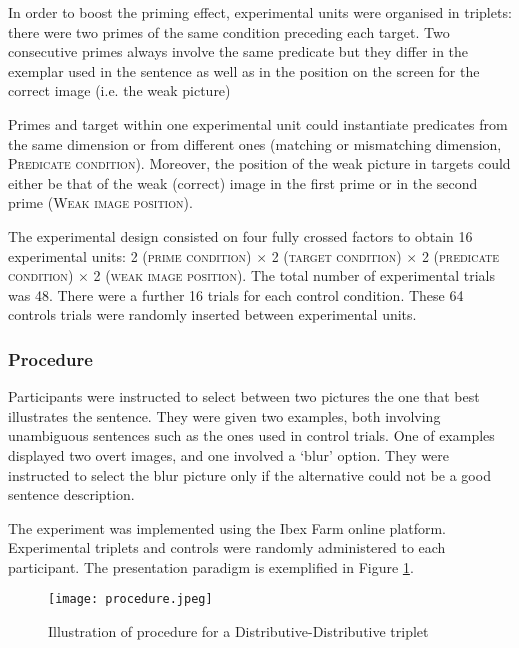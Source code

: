 \documentclass[a4paper, 11pt]{article}
\begin{document}
In order to boost the priming effect, experimental units were organised in triplets: there were two primes of the same condition preceding each target. Two consecutive primes always involve the same predicate but they differ in the exemplar used in the sentence as well as in the position on the screen for the correct image (i.e. the weak picture)

Primes and target within one experimental unit could instantiate predicates from the same dimension or from different ones (matching or mismatching dimension, \textsc{Predicate condition}). Moreover, the position of the weak picture in targets could either be that of the weak (correct) image in the first prime or in the second prime (\textsc{Weak image position}).

The experimental design consisted on four fully crossed factors to obtain 16 experimental units: 2 (\textsc{prime condition}) $\times$  2 (\textsc{target condition}) $\times$ 2 (\textsc{predicate condition}) $\times$ 2 (\textsc{weak image position}). The total number of experimental trials was 48. There were a further 16 trials for each control condition. These 64 controls trials were randomly inserted between experimental units.


\subsubsection{Procedure}
Participants were instructed to select between two pictures the one that best illustrates the sentence. 
They were given two examples, both involving unambiguous sentences such as the ones used in control trials. One of examples displayed two overt images, and one involved a `blur' option. They were instructed to select the blur picture only if the alternative could not be a good sentence description.

The experiment was implemented using the Ibex Farm online platform. Experimental triplets and controls were randomly administered to each participant. The presentation paradigm is exemplified in Figure \ref{fig:procedure}.


\begin{figure}[h!]
  \centering
    \texttt{[image: procedure.jpeg]}
      \caption{Illustration of procedure for a Distributive-Distributive triplet}
      \label{fig:procedure}
\end{figure}
\end{document}
